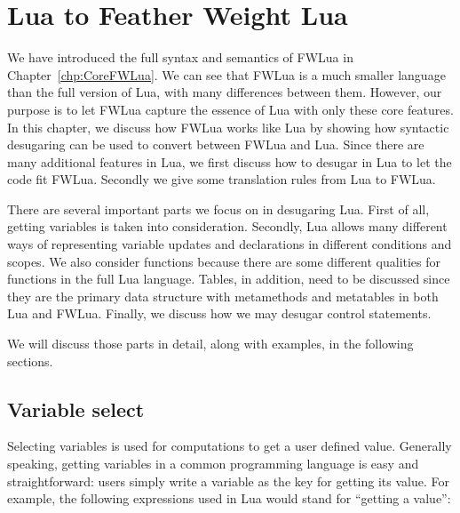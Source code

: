 \newcommand{\desugar}[2]{{#1} & \xlongequal[]{def} & {\begin{array}{@{}l@{}} #2 \end{array}}\\}
\newcommand{\desugarline}[1]{ & & {\begin{array}{@{}l@{}} #1 \end{array}}\\}

\newcommand{\translate}[2]{\llbracket {#1} \rrbracket & \xlongequal[]{} & {\begin{array}{@{}l@{}} #2 \end{array}}\\}
\newcommand{\translateline}[1]{ &  & {\begin{array}{@{}l@{}} #1 \end{array}}\\}

\chapter{Lua to Feather Weight Lua}
\label{chp:luaTranslation}

We have introduced the full syntax and semantics of FWLua in Chapter~\ref{chp:CoreFWLua}. We can see that FWLua is a much smaller language than the full version of Lua, with many differences between them.
However, our purpose is to let FWLua capture the essence of Lua with only these core features.
In this chapter, we discuss how FWLua works like Lua by showing how syntactic desugaring can be used to convert between FWLua and Lua. Since there are many additional features in Lua, we first discuss how to desugar in Lua to let the code fit FWLua. Secondly we give some translation rules from Lua to FWLua.

There are several important parts we focus on in desugaring Lua. First of all, getting variables is taken into consideration. Secondly, Lua allows many different ways of representing variable updates and declarations in different conditions and scopes. We also consider functions because there are some different qualities for functions in the full Lua language. Tables, in addition, need to be discussed since they are the primary data structure with metamethods and metatables in both Lua and FWLua. Finally, we discuss how we may desugar control statements. 

We will discuss those parts in detail, along with examples, in the following sections.


\section{Variable select}
Selecting variables is used for computations to get a user defined value. Generally speaking, getting variables in a common programming language is easy and straightforward: users simply write a variable as the key for getting its value. For example, the following expressions used in Lua would stand for ``getting a value'':

